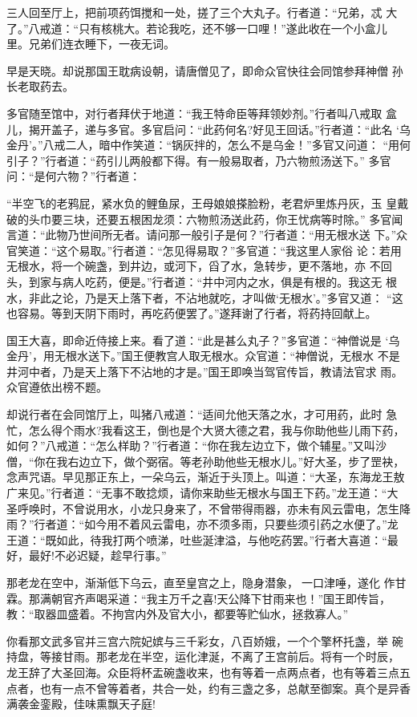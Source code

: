 三人回至厅上，把前项药饵搅和一处，搓了三个大丸子。行者道：“兄弟，忒
大了。”八戒道：“只有核桃大。若论我吃，还不够一口哩！”遂此收在一个小盒儿
里。兄弟们连衣睡下，一夜无词。

早是天晓。却说那国王耽病设朝，请唐僧见了，即命众官快往会同馆参拜神僧
孙长老取药去。

多官随至馆中，对行者拜伏于地道：“我王特命臣等拜领妙剂。”行者叫八戒取
盒儿，揭开盖子，递与多官。多官启问：“此药何名?好见王回话。”行者道：“此名
‘乌金丹’。”八戒二人，暗中作笑道：“锅灰拌的，怎么不是乌金！”多官又问道：
“用何引子？”行者道：“药引儿两般都下得。有一般易取者，乃六物煎汤送下。”
多官问：“是何六物？”行者道：

“半空飞的老鸦屁，紧水负的鲤鱼尿，王母娘娘搽脸粉，老君炉里炼丹灰，玉
皇戴破的头巾要三块，还要五根困龙须：六物煎汤送此药，你王忧病等时除。”
多官闻言道：“此物乃世间所无者。请问那一般引子是何？”行者道：“用无根水送
下。”众官笑道：“这个易取。”行者道：“怎见得易取？”多官道：“我这里人家俗
论：若用无根水，将一个碗盏，到井边，或河下，舀了水，急转步，更不落地，亦
不回头，到家与病人吃药，便是。”行者道：“井中河内之水，俱是有根的。我这无
根水，非此之论，乃是天上落下者，不沾地就吃，才叫做‘无根水’。”多官又道：
“这也容易。等到天阴下雨时，再吃药便罢了。”遂拜谢了行者，将药持回献上。

国王大喜，即命近侍接上来。看了道：“此是甚么丸子？”多官道：“神僧说是
‘乌金丹’，用无根水送下。”国王便教宫人取无根水。众官道：“神僧说，无根水
不是井河中者，乃是天上落下不沾地的才是。”国王即唤当驾官传旨，教请法官求
雨。众官遵依出榜不题。

却说行者在会同馆厅上，叫猪八戒道：“适间允他天落之水，才可用药，此时
急忙，怎么得个雨水?我看这王，倒也是个大贤大德之君，我与你助他些儿雨下药，
如何？”八戒道：“怎么样助？”行者道：“你在我左边立下，做个辅星。”又叫沙
僧，“你在我右边立下，做个弼宿。等老孙助他些无根水儿。”好大圣，步了罡袂，
念声咒语。早见那正东上，一朵乌云，渐近于头顶上。叫道：“大圣，东海龙王敖
广来见。”行者道：“无事不敢捻烦，请你来助些无根水与国王下药。”龙王道：“大
圣呼唤时，不曾说用水，小龙只身来了，不曾带得雨器，亦未有风云雷电，怎生降
雨？”行者道：“如今用不着风云雷电，亦不须多雨，只要些须引药之水便了。”龙
王道：“既如此，待我打两个喷涕，吐些涎津溢，与他吃药罢。”行者大喜道：“最
好，最好!不必迟疑，趁早行事。”

那老龙在空中，渐渐低下乌云，直至皇宫之上，隐身潜象，一口津唾，遂化
作甘霖。那满朝官齐声喝采道：“我主万千之喜!天公降下甘雨来也！”国王即传旨，
教：“取器皿盛着。不拘宫内外及官大小，都要等贮仙水，拯救寡人。”

你看那文武多官并三宫六院妃嫔与三千彩女，八百娇娥，一个个擎杯托盏，举
碗持盘，等接甘雨。那老龙在半空，运化津涎，不离了王宫前后。将有一个时辰，
龙王辞了大圣回海。众臣将杯盂碗盏收来，也有等着一点两点者，也有等着三点五
点者，也有一点不曾等着者，共合一处，约有三盏之多，总献至御案。真个是异香
满袭金銮殿，佳味熏飘天子庭!

